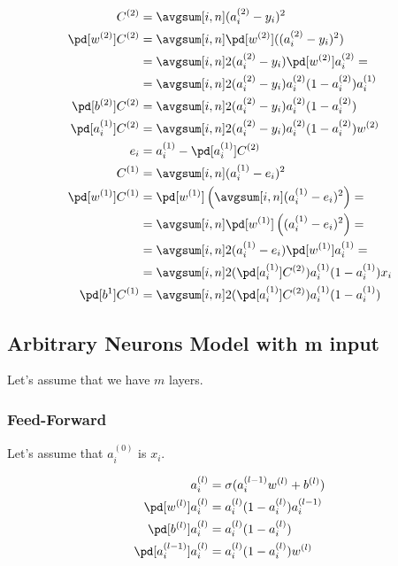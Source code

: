 \documentclass{article}
\begin{document}
\begin{align}
  C^{(2)} &= \avgsum[i, n] (a_i^{(2)} - y_i)^2 \\
  \pd[w^{(2)}] C^{(2)}
            &= \avgsum[i, n] \pd[w^{(2)}]((a_i^{(2)} - y_i)^2) \\
            &= \avgsum[i, n] 2(a_i^{(2)} - y_i)\pd[w^{(2)}]a_i^{(2)} = \\
            &= \avgsum[i, n] 2(a_i^{(2)} - y_i)a_i^{(2)}(1 - a_i^{(2)})a_i^{(1)} \\
  \pd[b^{(2)}] C^{(2)} &= \avgsum[i, n] 2(a_i^{(2)} - y_i)a_i^{(2)}(1 - a_i^{(2)}) \\
  \pd[a_i^{(1)}]C^{(2)} &= \avgsum[i, n] 2(a_i^{(2)} - y_i)a_i^{(2)}(1 - a_i^{(2)})w^{(2)} \\
  e_i &= a_i^{(1)} - \pd[a_i^{(1)}]C^{(2)} \\
  C^{(1)} &= \avgsum[i, n] (a_i^{(1)} - e_i)^2 \\
  \pd[w^{(1)}]C^{(1)}
            &= \pd[w^{(1)}]\left(\avgsum[i, n] (a_i^{(1)} - e_i)^2\right) =\\
            &= \avgsum[i, n] \pd[w^{(1)}]\left((a_i^{(1)} - e_i)^2\right) =\\
            &= \avgsum[i, n] 2(a_i^{(1)} - e_i)\pd[w^{(1)}]a_i^{(1)} =\\
            &= \avgsum[i, n] 2(\pd[a_i^{(1)}]C^{(2)})a_i^{(1)}(1 - a_i^{(1)})x_i \\
  \pd[b^{1}]C^{(1)} &= \avgsum[i, n] 2(\pd[a_i^{(1)}]C^{(2)})a_i^{(1)}(1 - a_i^{(1)})
\end{align}

\subsection{Arbitrary Neurons Model with m input}

Let's assume that we have $m$ layers.

\subsubsection{Feed-Forward}

Let's assume that $a_i^{(0)}$ is $x_i$.

\begin{align}
  a_i^{(l)} &= \sigma(a_i^{(l-1)}w^{(l)} + b^{(l)}) \\
  \pd[w^{(l)}]a_i^{(l)} &= a_i^{(l)}(1 - a_i^{(l)})a_i^{(l-1)} \\
  \pd[b^{(l)}]a_i^{(l)} &= a_i^{(l)}(1 - a_i^{(l)}) \\
  \pd[a_i^{(l-1)}]a_i^{(l)} &= a_i^{(l)}(1 - a_i^{(l)})w^{(l)}
\end{align}
\end{document}
